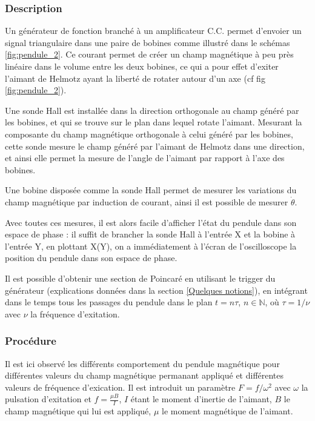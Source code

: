 \documentclass[a4paper,12pt,oneside]{article}
\begin{document}
\subsubsection{Description}
\label{description}

Un générateur de fonction branché à un amplificateur C.C. permet d'envoier un signal triangulaire dans une paire de bobines comme illustré dans le schémas \ref{fig:pendule_2}. Ce courant permet de créer un champ magnétique à peu près linéaire dans le volume entre les deux bobines, ce qui a pour effet d'exiter l'aimant de Helmotz ayant la liberté de rotater autour d'un axe (cf fig \ref{fig:pendule_2}).

Une sonde Hall est installée dans la direction orthogonale au champ généré par les bobines, et qui se trouve sur le plan dans lequel rotate l'aimant. Mesurant la composante du champ magnétique orthogonale à celui généré par les bobines, cette sonde mesure le champ généré par l'aimant de Helmotz dans une direction, et ainsi elle permet la mesure de l'angle de l'aimant par rapport à l'axe des bobines.

Une bobine disposée comme la sonde Hall permet de mesurer les variations du champ magnétique par induction de courant, ainsi il est possible de mesurer $\dot{\theta}$.

Avec toutes ces mesures, il est alors facile d'afficher l'état du pendule dans son espace de phase : il suffit de brancher la sonde Hall à l'entrée X et la bobine à l'entrée Y, en plottant X(Y), on a immédiatement à l'écran de l'oscilloscope la position du pendule dans son espace de phase.

Il est possible d'obtenir une section de Poincaré en utilisant le trigger du générateur (explications données dans la section \ref{Quelques notions}), en intégrant dans le temps tous les passages du pendule dans le plan $t=n\tau$, $n\in \mathbb{N}$, où $\tau=1/\nu$ avec $\nu$ la fréquence d'exitation.

\subsubsection{Procédure}

Il est ici observé les différents comportement du pendule magnétique pour différentes valeurs du champ magnétique permanant appliqué et différentes valeurs de fréquence d'exication. Il est introduit un paramètre $F=f/\omega^2$ avec $\omega$ la pulsation d'exitation et $f=\frac{\mu B}{I}$, $I$ étant le moment d'inertie de l'aimant, $B$ le champ magnétique qui lui est appliqué, $\mu$ le moment magnétique de l'aimant.
\end{document}
